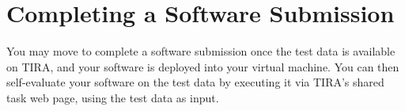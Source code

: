 \section{Completing a Software Submission}

You may move to complete a software submission once the test data is available on TIRA, and your software is deployed into your virtual machine. You can then self-evaluate your software on the test data by executing it via TIRA's shared task web page, using the test data as input.
